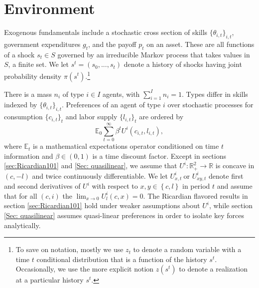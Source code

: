 \documentclass[thmsb,11pt]{article}
\begin{document}




\section{Environment}
\label{Sec: environment}

Exogenous fundamentals include a stochastic
cross section of skills $\{\theta_{i,t}\}_{i,t}$, government expenditures $g_t$,  and the payoff $p_t$ on an asset.
These  are all functions of a shock $s_{t}\in S$
governed by an irreducible Markov process that takes values in $S$, a finite set.
We let $s^{t}=\left(s_{0},...,s_{t}\right)$
denote a history of shocks having joint probability
 density $\pi(s^t)$.\footnote{To save on notation, mostly we use $z_{t}$ to denote a random variable
with a time $t$ conditional distribution that is a function of the
history $s^{t}$. Occasionally, we use the more explicit notion $z\left(s^{t}\right)$
to denote a realization at a particular history $s^{t}.$}

There is a mass $n_{i}$ of type $i\in I$ agents, with $\sum_{i=1}^{I}n_{i}=1.$
Types differ in skills indexed by $\{\theta_{i,t}\}_{i,t}$.
Preferences of an agent of type $i$ over stochastic processes for consumption $\{c_{i,t}\}_{t}$ and labor supply $\{l_{i,t}\}_{t}$
are ordered by
\begin{equation}
\mathbb{E}_{0}\sum_{t=0}^{\infty}\beta^{t}U^{i}\left(c_{i,t},l_{i,t}\right),\label{utility lifetime}
\end{equation}
where $\mathbb{E}_{t}$ is a mathematical expectations operator conditioned on time $t$ information and
$\beta\in\left(0,1\right)$ is a time discount factor.
Except in sections  \ref{sec:Ricardian101} and \ref{Sec: quasilinear}, we assume that $U^{i}:\mathbb{R}%
_{+}^{2}\rightarrow \mathbb{R}$ is concave in $\left( c,-l\right) $ and
twice continuously differentiable. We let $U_{x,t}^{i}\ $or $U_{xy,t}^{i}$
denote first and second derivatives of $U^{i}$ with respect to $x,y\in
\left\{ c,l\right\} $ in period $t$ and assume that for all $(c,i)$ the $\lim_{x\rightarrow
0}U_{l}^{i}\left( c,x\right) =0$. The Ricardian flavored results in section \ref{sec:Ricardian101} hold under weaker assumptions about $U^{i}$,
while section \ref{Sec: quasilinear} assumes quasi-linear preferences in order to isolate key forces analytically.
\end{document}
